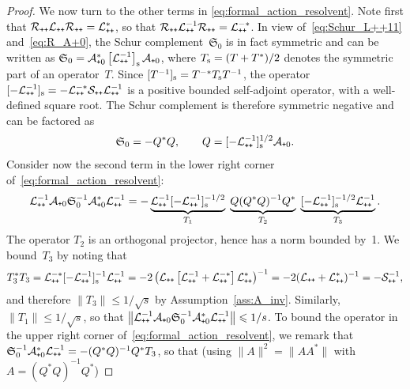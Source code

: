 \documentclass{article}
\newcommand{\cL}{\mathcal{L}}
\newcommand{\cLs}{\mathcal{S}}
\newcommand{\cLa}{\mathcal{A}}
\newcommand{\Schur}{\mathfrak{S}_0}
\newcommand{\cR}{\mathcal{R}}
\newcommand{\subplus}{\textnormal{\texttt{+}}}
\renewcommand{\le}{\leqslant}
\begin{document}
\begin{proof}
We now turn to the other terms in \eqref{eq:formal_action_resolvent}.
Note first that $\cR_{\subplus\subplus} \cL_{\subplus\subplus}
\cR_{\subplus\subplus} = \cL_{\subplus\subplus}^*$, so that
$\cR_{\subplus\subplus} \cL_{\subplus\subplus}^{-1}
\cR_{\subplus\subplus} = \cL_{\subplus\subplus}^{-*}$. In view
of~\eqref{eq:Schur_L++11} and~\eqref{eq:R_A+0}, the Schur
complement~$\Schur$ is in fact symmetric and can be written as $\Schur
= \cLa_{\subplus0}^{*} \left[\cL_{\subplus\subplus}^{-1}\right]_{\rm
  s} \cLa_{\subplus0}$, where $T_{{\rm s}} = (T + T^{*})/2$ denotes
the symmetric part of an operator~$T$. Since $[T^{-1}]_{{\rm s}} = T^{-*} T_{{\rm s}} T^{-1}$,
the operator $[-\cL_{\subplus\subplus}^{-1}]_{\rm s} =
-\cL_{\subplus\subplus}^{-*}
\cLs_{\subplus\subplus}\cL_{\subplus\subplus}^{-1}$ is a positive bounded
self-adjoint operator, with a well-defined square root. The Schur
complement is therefore symmetric negative and can be factored as
\begin{align*}
  \Schur = -Q^{*} Q, \qquad Q = [-\cL_{\subplus\subplus}^{-1}]_{{\rm s}}^{1/2} \cLa_{\subplus0}.
\end{align*}
Consider now the second term in the lower right corner of~\eqref{eq:formal_action_resolvent}:
\begin{align*}
  \cL_{\subplus\subplus}^{-1} \cLa_{\subplus0} \Schur^{-1} \cLa_{\subplus0}^{*} \cL_{\subplus\subplus}^{-1} = -\underbrace{\cL_{\subplus\subplus}^{-1} [-\cL_{\subplus\subplus}^{-1}]_{\rm s}^{-1/2}}_{T_{1}} \; \underbrace{Q (Q^{*}Q)^{-1} Q^{*}}_{T_{2}}\; \underbrace{[-\cL_{\subplus\subplus}^{-1}]_{\rm s}^{-1/2}\cL_{\subplus\subplus}^{-1}}_{T_{3}}.
\end{align*}
The operator $T_{2}$ is an orthogonal projector, hence has a norm bounded by~1. We bound~$T_{3}$ by noting that
\begin{align*}
  T_{3}^{*} T_{3} = \cL_{\subplus\subplus}^{-*} [-\cL_{\subplus\subplus}^{-1}]_{\rm s}^{-1} \cL_{\subplus\subplus}^{-1} = -2\left(\cL_{\subplus\subplus}\left[\cL_{\subplus\subplus}^{-1}+\cL_{\subplus\subplus}^{-*}\right]\cL_{\subplus\subplus}^*\right)^{-1} = -2(\cL_{\subplus\subplus}+\cL_{\subplus\subplus}^*)^{-1} = -\cLs_{\subplus\subplus}^{-1},
\end{align*}
and therefore $\|T_{3}\| \le 1/{\sqrt s}$ by Assumption~\ref{ass:A_inv}. Similarly, $\|T_{1}\| \le 1/{\sqrt s}$, so that $\norm{\cL_{\subplus\subplus}^{-1} \cLa_{\subplus0} \Schur^{-1} \cLa_{\subplus0}^{*} \cL_{\subplus\subplus}^{-1}} \le 1/s$. To bound the operator in the upper right corner of~\eqref{eq:formal_action_resolvent}, we remark that $\Schur^{-1} \cLa_{\subplus0}^{*} \cL_{\subplus\subplus}^{-1} = -(Q^{*}Q)^{-1} Q^* T_3$, so that (using $\|A\|^2 = \|A A^*\|$ with $A=(Q^{*}Q)^{-1} Q^{*}$)

\end{proof}
\end{document}
